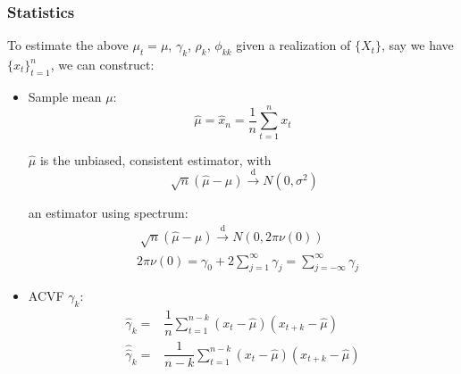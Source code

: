 \begin{itemize}[topsep=2pt,itemsep=0pt]
\begin{itemize}[topsep=2pt,itemsep=0pt]
            
            
        \end{itemize}
        
            

        
        
        
    \end{itemize}

\subsubsection{Statistics}

    To estimate the above $ \mu _t=\mu $, $ \gamma _k $, $ \rho _k $, $ \phi _{kk} $ given a realization of $ \{X_t\} $, say we have $ \{x_t\}_{t=1}^n $, we can construct:
    \begin{itemize}[topsep=2pt,itemsep=0pt]
        \item Sample mean $ \mu  $:
        \begin{equation}
            \hat{\mu }=\hat{x}_n=\dfrac{1}{n}\sum_{t=1}^nx_t 
        \end{equation}

        $ \hat{\mu } $ is the unbiased, consistent estimator, with
        \[
            \sqrt[]{n}(\hat{\mu }-\mu )\xrightarrow[]{\mathrm{d}} N(0,\sigma ^2) 
        \]
        
        an estimator using spectrum:
        \begin{align}
            &\sqrt[]{n}(\hat{\mu }-\mu )\xrightarrow[]{\mathrm{d}} N(0,2\pi \nu (0))\\
            &2\pi \nu (0)=\gamma _0+2\sum_{j=1}^\infty \gamma _j=\sum_{j=-\infty}^\infty \gamma _j 
        \end{align}
        
        \item ACVF $ \gamma _k $:
        \begin{align}
            \hat{\gamma }_k=&\dfrac{1}{n}\sum_{t=1}^{n-k}(x_t-\hat{\mu })(x_{t+k}-\hat{\mu }) \\
            \hat{\hat{\gamma }}_k=&\dfrac{1}{n-k}\sum_{t=1}^{n-k}(x_t-\hat{\mu })(x_{t+k}-\hat{\mu }) 
        \end{align}


\end{itemize}
